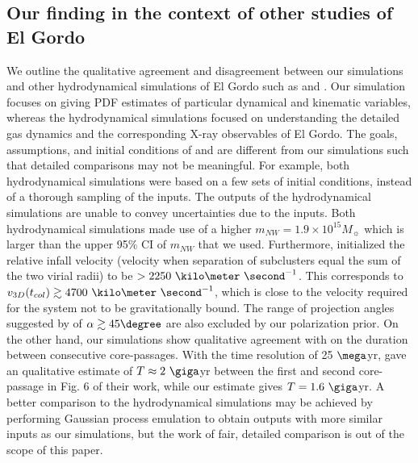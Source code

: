 \subsection{Our finding in the context of other studies of El Gordo}
We outline the qualitative agreement and disagreement between our
simulations and other hydrodynamical simulations of El Gordo such as
\cite{Donnert13} and \cite{Molnar14}. Our simulation focuses on giving PDF
estimates of particular dynamical and kinematic variables, whereas the
hydrodynamical simulations focused on understanding the detailed gas dynamics
and the corresponding X-ray observables of El Gordo. The goals,
assumptions, and initial conditions of \cite{Donnert13} and \cite{Molnar14}
are different from our simulations such that detailed comparisons may not
be meaningful. 
For example, both hydrodynamical simulations were based on a few sets of initial
conditions, instead of a thorough sampling of the inputs. The outputs of
the hydrodynamical simulations are unable to convey uncertainties due to
the inputs. Both hydrodynamical simulations made use of a higher $m_{NW} =
1.9 \times 10^{15} M_{\sun}$ which is larger than the upper 95\% CI of $m_{NW}$
that we used. Furthermore, \cite{Molnar14} initialized the relative infall velocity (velocity when separation of subclusters equal the sum
of the two virial radii) to be $> 2250~\kilo \meter~
\second^{-1}$. This corresponds to $v_{3D}(t_{col}) \gtrsim 4700~\kilo
\meter~\second^{-1}$, which is close to the velocity required for the
system not to be gravitationally bound. The range of projection angles suggested by
\cite{Molnar14} of $\alpha \gtrsim 45\degree$ are also excluded by our polarization prior.  On the other hand, our simulations show qualitative agreement with
\cite{Donnert13} on the duration between consecutive core-passages. With
the time resolution of 25 $\mega$yr, \cite{Donnert13} gave an
qualitative estimate of  $T\approx 2~\giga$yr between the first and second
core-passage in Fig. 6 of their work, while our estimate gives $T
= 1.6~\giga$yr.  A better comparison to the hydrodynamical simulations
may be achieved by performing Gaussian process emulation to obtain outputs
with more similar inputs as our simulations, but the work of fair, detailed
comparison is out of the scope of this paper. 

